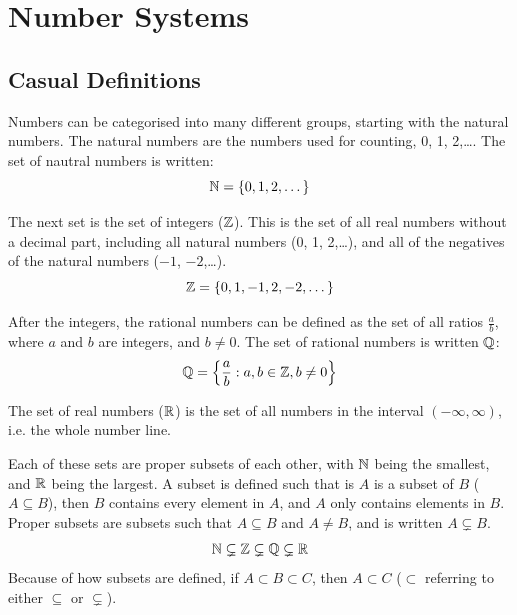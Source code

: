 \section{Number Systems} \label{number_systems}
    \subsection{Casual Definitions}
        Numbers can be categorised into many different groups, starting with the natural numbers.
        The natural numbers are the numbers used for counting, 0, 1, 2,\dots.
        The set of nautral numbers is written:
        \begin{equation}
            \operatorname{\mathbb{N}}=\left\{0,1,2,\dots\right\}
        \end{equation}
        
        The next set is the set of integers ($\operatorname{\mathbb{Z}}$).
        This is the set of all real numbers without a decimal part, including all natural numbers (0, 1, 2,\dots), and all of the negatives of the natural numbers ($-1$, $-2$,\dots).
        \begin{equation}
            \operatorname{\mathbb{Z}}=\left\{0,1,-1,2,-2,\dots\right\}
        \end{equation}
        
        After the integers, the rational numbers can be defined as the set of all ratios $\frac{a}{b}$, where $a$ and $b$ are integers, and $b\neq0$.
        The set of rational numbers is written $\operatorname{\mathbb{Q}}$:
        \begin{equation}
            \operatorname{\mathbb{Q}}=\left\{\frac{a}{b}:a,b\in\operatorname{\mathbb{Z}},b\neq0\right\}
        \end{equation}

        The set of real numbers ($\operatorname{\mathbb{R}}$) is the set of all numbers in the interval $(-\infty,\infty)$, i.e. the whole number line.

        Each of these sets are proper subsets of each other, with $\operatorname{\mathbb{N}}$ being the smallest, and $\operatorname{\mathbb{R}}$ being the largest.
        A subset is defined such that is $A$ is a subset of $B$ ($A\subseteq B$), then $B$ contains every element in $A$, and $A$ only contains elements in $B$.
        Proper subsets are subsets such that $A\subseteq B$ and $A\neq B$, and is written $A\subsetneq B$.
        \begin{equation}
            \operatorname{\mathbb{N}}\subsetneq\operatorname{\mathbb{Z}}\subsetneq\operatorname{\mathbb{Q}}\subsetneq\operatorname{\mathbb{R}}
        \end{equation}
        Because of how subsets are defined, if $A\subset B\subset C$, then $A\subset C$ ($\subset$ referring to either $\subseteq$ or $\subsetneq$).

